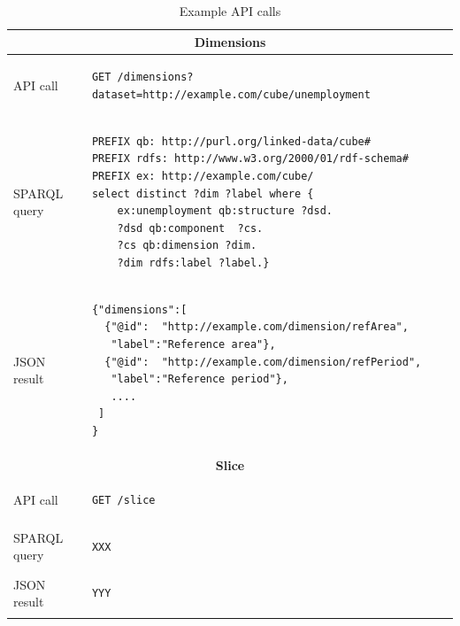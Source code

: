 \documentclass{llncs}
\begin{document}
\begin{table}
\caption{Example API calls}
\begin{tabular}{|l|l|}
\hline
\multicolumn{2}{|c|}{\textbf{Dimensions}}\\

\hline
API call &
\begin{minipage}[t]{4.5in}
 \begin{verbatim} 
GET /dimensions?dataset=http://example.com/cube/unemployment         
\end{verbatim}
\end{minipage}\\\hline

SPARQL query  &
\begin{minipage}[t]{4.5in}
 \begin{verbatim} 
PREFIX qb: http://purl.org/linked-data/cube#
PREFIX rdfs: http://www.w3.org/2000/01/rdf-schema#
PREFIX ex: http://example.com/cube/
select distinct ?dim ?label where {
    ex:unemployment qb:structure ?dsd.
    ?dsd qb:component  ?cs.
    ?cs qb:dimension ?dim.
    ?dim rdfs:label ?label.} 
\end{verbatim}
\end{minipage}\\ \hline

JSON result &
\begin{minipage}[t]{4.5in}
 \begin{verbatim} 
{"dimensions":[
  {"@id":  "http://example.com/dimension/refArea",
   "label":"Reference area"},
  {"@id":  "http://example.com/dimension/refPeriod",
   "label":"Reference period"},
   ....
 ]
}  
\end{verbatim}
\end{minipage}\\\hline



\multicolumn{2}{|c|}{\textbf{Slice}}\\

\hline
API call &
\begin{minipage}[t]{4.5in}
 \begin{verbatim} 
GET /slice
\end{verbatim}
\end{minipage}\\\hline

SPARQL query  &
\begin{minipage}[t]{4.5in}
 \begin{verbatim} 
XXX
\end{verbatim}
\end{minipage}\\ \hline

JSON result &
\begin{minipage}[t]{4.5in}
 \begin{verbatim} 
YYY 
\end{verbatim}
\end{minipage}\\\hline


\end{tabular}
\label{tbl:apiexamplecall}
\end{table}
\end{document}
